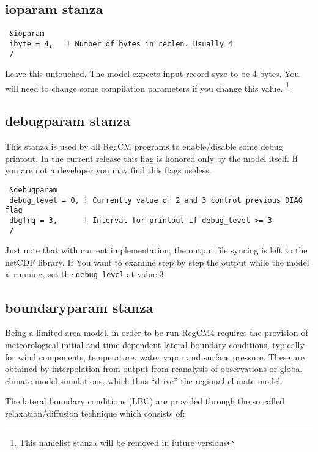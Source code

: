 \subsection{ioparam stanza}

{\footnotesize
\begin{Verbatim}
 &ioparam
 ibyte = 4,   ! Number of bytes in reclen. Usually 4
 /
\end{Verbatim}
}

Leave this untouched. The model expects input record syze to be 4 bytes.
You will need to change some compilation parameters if you change this value.
\footnote{This namelist stanza will be removed in future versions}

\subsection{debugparam stanza}

This stanza is used by all RegCM programs to enable/disable some debug printout.
In the current release this flag is honored only by the model itself. If you
are not a developer you may find this flags useless.

{\footnotesize
\begin{Verbatim}
 &debugparam
 debug_level = 0, ! Currently value of 2 and 3 control previous DIAG flag
 dbgfrq = 3,      ! Interval for printout if debug_level >= 3
 /
\end{Verbatim}
}

Just note that with current implementation, the output file syncing is left
to the netCDF library. If You want to examine step by step the output while
the model is running, set the \verb=debug_level= at value 3.

\subsection{boundaryparam stanza}

Being a limited area model, in order to be run RegCM4 requires the provision
of meteorological initial and time dependent lateral boundary conditions,
typically for wind components, temperature, water vapor and surface pressure.
These are obtained by interpolation from output from reanalysis of observations
or global climate model simulations, which thus “drive” the regional climate
model.

The lateral boundary conditions (LBC) are provided through the so called
relaxation/diffusion technique which consists of:

